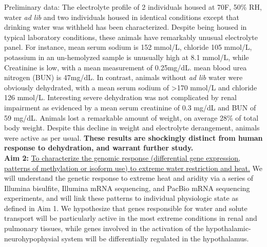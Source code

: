 \documentclass[11pt]{article}
\begin{document}
%
%


Preliminary data: The electrolyte profile of 2 individuals housed at 70F, 50\% RH, water \textit{ad lib} and two individuals housed in identical conditions except that drinking water was withheld has been characterized. Despite being housed in typical laboratory conditions, these animals have remarkably unusual electrolyte panel. For instance, mean serum sodium is 152 mmol/L, chloride 105 mmol/L, potassium in an un-hemolyzed sample is unusually high at 8.1 mmol/L, while Creatinine is low, with a mean measurement of 0.25mg/dL. mean blood urea nitrogen (BUN) is 47mg/dL. In contrast, animals without \textit{ad lib} water were obviously dehydrated, with a mean serum sodium of \textgreater 170 mmol/L and chloride 126 mmol/L. Interesting severe dehydration was not complicated by renal impairment as evidenced by a mean serum creatinine of 0.3 mg/dL and BUN of 59 mg/dL. Animals lost a remarkable amount of weight, on average 28\% of total body weight. Despite this decline in weight and electrolyte derangement, animals were active as per usual. \textbf{These results are shockingly distinct from human response to dehydration, and warrant further study.}  \\  


\noindent \textbf{Aim 2:} \ul{To characterize the genomic response (differential gene expression, patterns of methylation or isoform use) to extreme water restriction and heat.} {We will understand the genetic response to extreme heat and aridity via a series of Illumina bisulfite, Illumina mRNA sequencing, and PacBio mRNA sequencing experiments, and will link these patterns to individual physiologic state as defined in Aim 1.} We hypothesize that genes responsible for water and solute transport will be particularly active in the most extreme conditions in renal and pulmonary tissues, while genes involved in the activation of the hypothalamic-neurohypophysial system will be differentially regulated in the hypothalamus.\\
\end{document}
